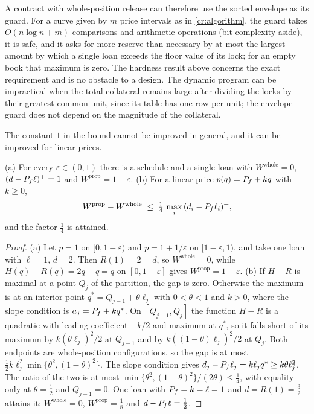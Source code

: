 A contract with whole-position release can therefore use the sorted envelope as its guard. For a curve given by $m$ price intervals as in \cref{cr:algorithm}, the guard takes $O(n\log n+m)$ comparisons and arithmetic operations (bit complexity aside), it is safe, and it asks for more reserve than necessary by at most the largest amount by which a single loan exceeds the floor value of its lock; for an empty book that maximum is zero. The hardness result above concerns the exact requirement and is no obstacle to a design. The dynamic program can be impractical when the total collateral remains large after dividing the locks by their greatest common unit, since its table has one row per unit; the envelope guard does not depend on the magnitude of the collateral.

The constant $1$ in the bound cannot be improved in general, and it can be improved for linear prices.

\begin{corollary}[Sharpness]\label{cr:guardsharp}
(a) For every $\varepsilon\in(0,1)$ there is a schedule and a single loan with $W^{\mathrm{whole}}=0$, $(d-P_f\ell)^+=1$ and $W^{\mathrm{prop}}=1-\varepsilon$. (b) For a linear price $p(q)=P_f+kq$ with $k\ge0$,
\[
W^{\mathrm{prop}}-W^{\mathrm{whole}}\;\le\;\tfrac14\,\max_i\,(d_i-P_f\ell_i)^+ ,
\]
and the factor $\tfrac14$ is attained.
\end{corollary}
\begin{proof}
(a) Let $p=1$ on $[0,1-\varepsilon)$ and $p=1+1/\varepsilon$ on $[1-\varepsilon,1)$, and take one loan with $\ell=1$, $d=2$. Then $R(1)=2=d$, so $W^{\mathrm{whole}}=0$, while $H(q)-R(q)=2q-q=q$ on $[0,1-\varepsilon]$ gives $W^{\mathrm{prop}}=1-\varepsilon$. (b) If $H-R$ is maximal at a point $Q_j$ of the partition, the gap is zero. Otherwise the maximum is at an interior point $q^\ast=Q_{j-1}+\theta\ell_j$ with $0<\theta<1$ and $k>0$, where the slope condition is $a_j=P_f+kq^\ast$. On $[Q_{j-1},Q_j]$ the function $H-R$ is a quadratic with leading coefficient $-k/2$ and maximum at $q^\ast$, so it falls short of its maximum by $k(\theta\ell_j)^2/2$ at $Q_{j-1}$ and by $k((1-\theta)\ell_j)^2/2$ at $Q_j$. Both endpoints are whole-position configurations, so the gap is at most $\tfrac12k\ell_j^2\min\{\theta^2,(1-\theta)^2\}$. The slope condition gives $d_j-P_f\ell_j=k\ell_jq^\ast\ge k\theta\ell_j^2$. The ratio of the two is at most $\min\{\theta^2,(1-\theta)^2\}/(2\theta)\le\tfrac14$, with equality only at $\theta=\tfrac12$ and $Q_{j-1}=0$. One loan with $P_f=k=\ell=1$ and $d=R(1)=\tfrac32$ attains it: $W^{\mathrm{whole}}=0$, $W^{\mathrm{prop}}=\tfrac18$ and $d-P_f\ell=\tfrac12$.
\end{proof}

